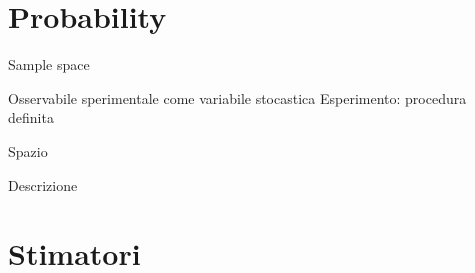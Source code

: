 \section{Probability}

\begin{frame}{Sample space}
\begin{block}{Osservabile sperimentale come variabile stocastica}
Esperimento: procedura definita
\end{block}

\begin{block}{Spazio }

\end{block}

\end{frame}

\begin{wordonframe}{Descrizione}



\end{wordonframe}

\section{Stimatori}

